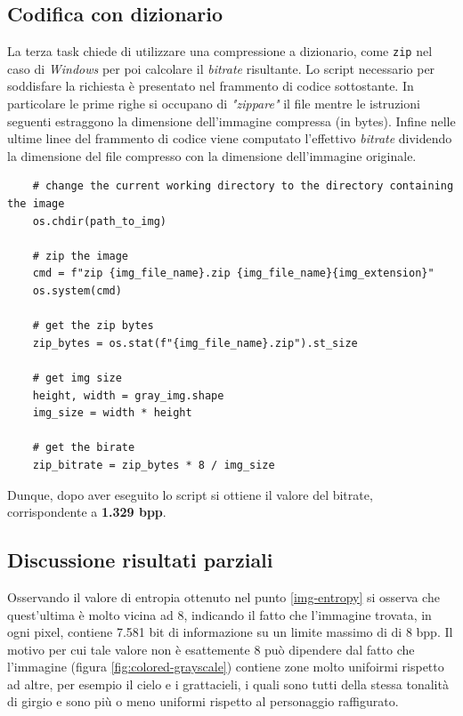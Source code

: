 \vspace{15px}\subsection{Codifica con dizionario} \label{dictionary-coding}
La terza task chiede di utilizzare una compressione a dizionario, come \texttt{zip} nel caso di \textsl{Windows} per poi calcolare il \textsl{bitrate} risultante. Lo script necessario per soddisfare la richiesta è presentato nel frammento di codice sottostante. In particolare le prime righe si occupano di \textsl{"zippare"} il file mentre le istruzioni seguenti estraggono la dimensione dell'immagine compressa (in bytes). Infine nelle ultime linee del frammento di codice viene computato l'effettivo \textsl{bitrate} dividendo la dimensione del file compresso con la dimensione dell'immagine originale.

\begin{lstlisting}
    # change the current working directory to the directory containing the image
    os.chdir(path_to_img)

    # zip the image
    cmd = f"zip {img_file_name}.zip {img_file_name}{img_extension}"
    os.system(cmd)
    
    # get the zip bytes
    zip_bytes = os.stat(f"{img_file_name}.zip").st_size

    # get img size
    height, width = gray_img.shape
    img_size = width * height

    # get the birate
    zip_bitrate = zip_bytes * 8 / img_size 
\end{lstlisting}

\noindent Dunque, dopo aver eseguito lo script si ottiene il valore del bitrate, corrispondente a \textbf{1.329 bpp}. 



\vspace{15px}\subsection{Discussione risultati parziali}
Osservando il valore di entropia ottenuto nel punto \ref{img-entropy} si osserva che quest'ultima è molto vicina ad 8, indicando il fatto che l'immagine trovata, in ogni pixel, contiene 7.581 bit di  informazione su un limite massimo di di 8 bpp. Il motivo per cui tale valore non è esattemente 8 può dipendere dal fatto che l'immagine (figura \ref{fig:colored-grayscale}) contiene zone molto unifoirmi rispetto ad altre, per esempio il cielo e i grattacieli, i quali sono tutti della stessa tonalità di girgio e sono più o meno uniformi rispetto al personaggio raffigurato.

